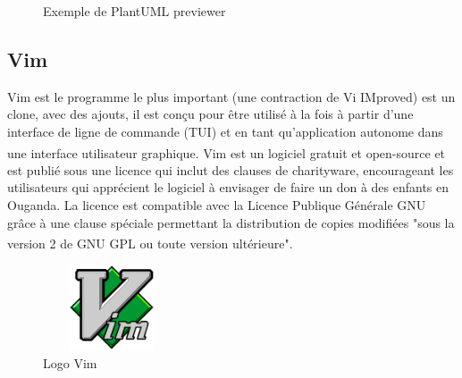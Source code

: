 \documentclass[12pt]{report}
\begin{document}
\vspace{0.15in}

\begin{figure}[h]
\centering
    \caption{Exemple de PlantUML previewer}
\end{figure}

\vspace{-0.2in}

\subsection{Vim}
Vim est le programme le plus important (une contraction de Vi IMproved) est un clone, avec des ajouts, il est conçu pour être utilisé à la fois à partir d'une interface de ligne de commande (TUI) et en tant qu'application autonome dans une interface utilisateur graphique. Vim\textsuperscript{\cite{vim}} est un logiciel gratuit et open-source et est publié sous une licence qui inclut des clauses de charityware, encourageant les utilisateurs qui apprécient le logiciel à envisager de faire un don à des enfants en Ouganda. La licence est compatible avec la Licence Publique Générale GNU grâce à une clause spéciale permettant la distribution de copies modifiées "sous la version 2 de GNU GPL ou toute version ultérieure".\textsuperscript{\cite{schulz2007hacking}}

\vspace{0.25in}

\begin{figure}[h]
\centering
    \includegraphics[width = 1.6in, height = 1in]{../Images/Vim.png}
\caption{Logo Vim}
\end{figure}
\end{document}
